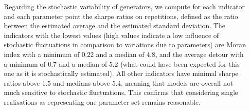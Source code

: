\documentclass[letterpaper]{article}
\begin{document}
Regarding the stochastic variability of generators, we compute for each indicator and each parameter point the sharpe ratios on repetitions, defined as the ratio between the estimated average and the estimated standard deviation. The indicators with the lowest values (high values indicate a low influence of stochastic fluctuations in comparison to variations due to parameters) are Moran index with a minimum of 0.22 and a median of 4.8, and the average detour with a minimum of 0.7 and a median of 5.2 (what could have been expected for this one as it is stochastically estimated). All other indicators have minimal sharpe ratios above 1.5 and medians above 5.4, meaning that models are overall not much sensitive to stochastic fluctuations. This confirms that considering single realisations as representing one parameter set remains reasonable.
\end{document}
